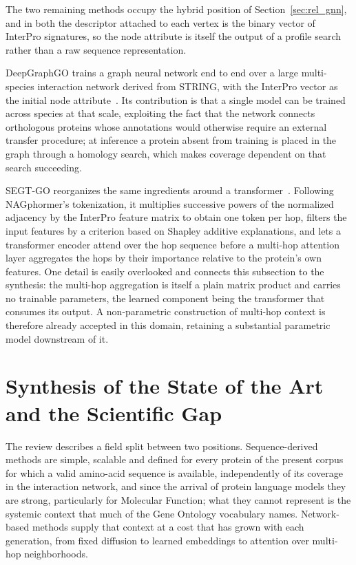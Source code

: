 \documentclass[Ingles]{ic-tese-v3}
\begin{document}
The two remaining methods occupy the hybrid position of Section~\ref{sec:rel_gnn}, and in both the
descriptor attached to each vertex is the binary vector of InterPro signatures, so the node attribute
is itself the output of a profile search rather than a raw sequence representation.

DeepGraphGO trains a graph neural network end to end over a large multi-species interaction network
derived from STRING, with the InterPro vector as the initial node
attribute~\cite{you_deepgraphgo_2021}. Its contribution is that a single model can be trained across
species at that scale, exploiting the fact that the network connects orthologous proteins whose
annotations would otherwise require an external transfer procedure; at inference a protein absent
from training is placed in the graph through a homology search, which makes coverage dependent on
that search succeeding.

SEGT-GO reorganizes the same ingredients around a transformer~\cite{wang2025segtgo}. Following
NAGphormer's tokenization, it multiplies successive powers of the normalized adjacency by the
InterPro feature matrix to obtain one token per hop, filters the input features by a criterion based
on Shapley additive explanations, and lets a transformer encoder attend over the hop sequence before
a multi-hop attention layer aggregates the hops by their importance relative to the protein's own
features. One detail is easily overlooked and connects this subsection to the synthesis: the
multi-hop aggregation is itself a plain matrix product and carries no trainable parameters, the
learned component being the transformer that consumes its output. A non-parametric construction of
multi-hop context is therefore already accepted in this domain, retaining a substantial parametric
model downstream of it.

\section{Synthesis of the State of the Art and the Scientific Gap}
\label{sec:rel_lacuna}

The review describes a field split between two positions. Sequence-derived methods are simple,
scalable and defined for every protein of the present corpus for which a valid amino-acid sequence
is available, independently of its coverage in the interaction network, and since the arrival of
protein language models they are strong, particularly for Molecular Function; what they cannot
represent is the systemic context that much of the Gene Ontology vocabulary names. Network-based
methods supply that context at a cost that has grown with each generation, from fixed diffusion to
learned embeddings to attention over multi-hop neighborhoods.
\end{document}
